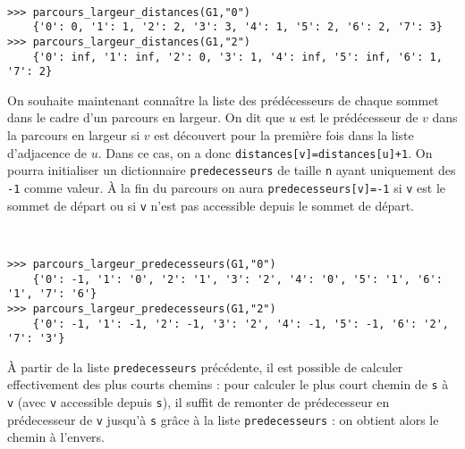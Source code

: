 \begin{exemple}~\\
\vspace{-.5cm}
\begin{lstlisting}
>>> parcours_largeur_distances(G1,"0")
	{'0': 0, '1': 1, '2': 2, '3': 3, '4': 1, '5': 2, '6': 2, '7': 3}
>>> parcours_largeur_distances(G1,"2")
	{'0': inf, '1': inf, '2': 0, '3': 1, '4': inf, '5': inf, '6': 1, '7': 2}
\end{lstlisting}
\end{exemple}
On souhaite maintenant connaître la liste des prédécesseurs de chaque sommet dans le cadre d'un parcours en largeur. On dit que $u$ est le prédécesseur de $v$ dans la parcours en largeur si $v$ est découvert pour la première fois dans la liste d'adjacence de $u$. Dans ce cas, on a donc \texttt{distances[v]=distances[u]+1}.  On pourra initialiser un dictionnaire  \texttt{predecesseurs} de taille \texttt{n} ayant uniquement des \texttt{-1} comme valeur. À la fin du parcours on aura \texttt{predecesseurs[v]=-1} si \texttt{v} est le sommet de départ ou si \texttt{v} n'est pas accessible depuis le sommet de départ. 

\begin{exemple}~\\
\vspace{-.5cm}
\begin{lstlisting}
>>> parcours_largeur_predecesseurs(G1,"0")
	{'0': -1, '1': '0', '2': '1', '3': '2', '4': '0', '5': '1', '6': '1', '7': '6'}
>>> parcours_largeur_predecesseurs(G1,"2")
	{'0': -1, '1': -1, '2': -1, '3': '2', '4': -1, '5': -1, '6': '2', '7': '3'}
\end{lstlisting}
\end{exemple}

 À partir de la liste \texttt{predecesseurs} précédente, il est possible de calculer
effectivement des plus courts chemins : pour calculer le plus court chemin de \texttt{s} à \texttt{v} (avec \texttt{v} accessible depuis \texttt{s}), il
suffit de remonter de prédecesseur en prédecesseur de \texttt{v} jusqu’à \texttt{s} grâce à la liste \texttt{predecesseurs} : on obtient alors le chemin à
l’envers.


